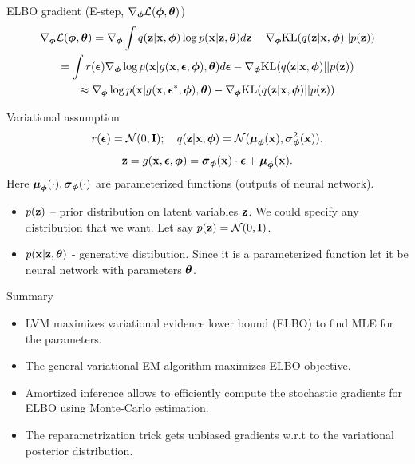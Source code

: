 \begin{frame}{ELBO gradient (E-step, $\nabla_{\boldsymbol{\phi}} \mathcal{L}(\boldsymbol{\phi}, \boldsymbol{\theta})$)}
	\vspace{-0.5cm}
	\begin{multline*}
		\nabla_{\boldsymbol{\phi}} \mathcal{L} (\boldsymbol{\phi}, \boldsymbol{\theta}) = \nabla_{\boldsymbol{\phi}}\int q(\mathbf{z}|\mathbf{x}, \boldsymbol{\phi}) \log p(\mathbf{x}| \mathbf{z}, \boldsymbol{\theta})  d\mathbf{z} - \nabla_{\boldsymbol{\phi}} \text{KL}(q(\mathbf{z} | \mathbf{x}, \boldsymbol{\phi}) || p(\mathbf{z}))
		\\ = \int r(\boldsymbol{\epsilon}) \nabla_{\boldsymbol{\phi}} \log p(\mathbf{x} | g(\mathbf{x}, \boldsymbol{\epsilon}, \boldsymbol{\phi}), \boldsymbol{\theta}) d\boldsymbol{\epsilon}  - \nabla_{\boldsymbol{\phi}} \text{KL}(q(\mathbf{z} | \mathbf{x}, \boldsymbol{\phi}) || p(\mathbf{z}))
		\\ \approx \nabla_{\boldsymbol{\phi}} \log p(\mathbf{x} | g(\mathbf{x}, \boldsymbol{\epsilon}^*, \boldsymbol{\phi}), \boldsymbol{\theta})  - \nabla_{\boldsymbol{\phi}} \text{KL}(q(\mathbf{z} | \mathbf{x}, \boldsymbol{\phi}) || p(\mathbf{z}))
	\end{multline*}
	\vspace{-0.5cm}
	\begin{block}{Variational assumption}
		\vspace{-0.3cm}
		\[
		r(\boldsymbol{\epsilon}) = \mathcal{N}(0, \mathbf{I}); \quad  q(\mathbf{z}| \mathbf{x}, \boldsymbol{\phi}) = \mathcal{N} (\boldsymbol{\mu}_{\boldsymbol{\phi}}(\mathbf{x}), \boldsymbol{\sigma}^2_{\boldsymbol{\phi}}(\mathbf{x})).
		\]
		\[
		\mathbf{z} = g(\mathbf{x}, \boldsymbol{\epsilon}, \boldsymbol{\phi}) = \boldsymbol{\sigma}_{\boldsymbol{\phi}}(\mathbf{x}) \cdot \boldsymbol{\epsilon} + \boldsymbol{\mu}_{\boldsymbol{\phi}}(\mathbf{x}).
		\]
		Here $\boldsymbol{\mu}_{\boldsymbol{\phi}}(\cdot), \boldsymbol{\sigma}_{\boldsymbol{\phi}}(\cdot)$ are parameterized functions (outputs of neural network).
	\end{block}
	\begin{itemize}
		\item $p(\mathbf{z})$ -- prior distribution on latent variables $\mathbf{z}$. We could specify any distribution that we want. Let say $p(\mathbf{z}) = \mathcal{N} (0, \mathbf{I})$.
		\item $p(\mathbf{x} | \mathbf{z}, \boldsymbol{\theta})$ - generative distibution. Since it is a parameterized function let it be neural network with parameters $\boldsymbol{\theta}$.
	\end{itemize}
\end{frame}
\begin{frame}{Summary}
	\begin{itemize}
		\item LVM maximizes variational evidence lower bound (ELBO) to find MLE for the parameters.
		\vfill
		\item The general variational EM algorithm maximizes ELBO objective.
		\vfill
		\item Amortized inference allows to efficiently compute the stochastic gradients for ELBO using Monte-Carlo estimation.
		\vfill
		\item The reparametrization trick gets unbiased gradients w.r.t to the variational posterior distribution.
	\end{itemize}
\end{frame}
 